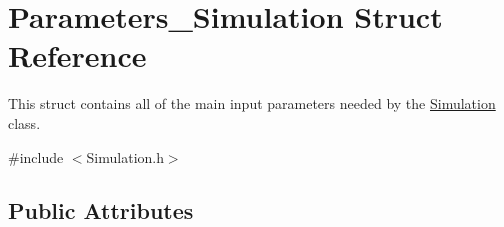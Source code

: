 \hypertarget{struct_parameters___simulation}{}\section{Parameters\+\_\+\+Simulation Struct Reference}
\label{struct_parameters___simulation}


This struct contains all of the main input parameters needed by the \hyperlink{class_simulation}{Simulation} class.  




{\ttfamily \#include $<$Simulation.\+h$>$}

\subsection*{Public Attributes}
